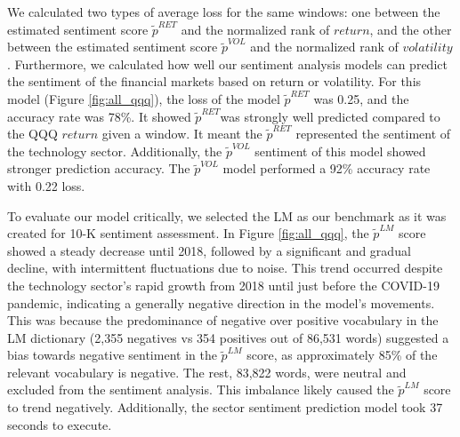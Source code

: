\documentclass[logo,bsc,singlespacing,parskip]{infthesis}
\begin{document}
We calculated two types of average loss for the same windows: one between the estimated sentiment score $\tilde{p}^{RET}$ and the normalized rank of $return$, and the other between the estimated sentiment score $\tilde{p}^{VOL}$ and the normalized rank of $volatility$. Furthermore, we calculated how well our sentiment analysis models can predict the sentiment of the financial markets based on return or volatility. For this model (Figure \ref{fig:all_qqq}), the loss of the model $\tilde{p}^{RET}$ was 0.25, and the accuracy rate was 78\%. It showed $\tilde{p}^{RET}$was strongly well predicted compared to the QQQ $return$ given a window. It meant the $\tilde{p}^{RET}$ represented the sentiment of the technology sector. Additionally, the $\tilde{p}^{VOL}$ sentiment of this model showed stronger prediction accuracy. The $\tilde{p}^{VOL}$ model performed a 92\% accuracy rate with 0.22 loss. 

To evaluate our model critically, we selected the LM as our benchmark as it was created for 10-K sentiment assessment. In Figure \ref{fig:all_qqq}, the $\tilde{p}^{LM}$ score showed a steady decrease until 2018, followed by a significant and gradual decline, with intermittent fluctuations due to noise. This trend occurred despite the technology sector's rapid growth from 2018 until just before the COVID-19 pandemic, indicating a generally negative direction in the model's movements. This was because the predominance of negative over positive vocabulary in the LM dictionary (2,355 negatives vs 354 positives out of 86,531 words) suggested a bias towards negative sentiment in the $\tilde{p}^{LM}$ score, as approximately 85\% of the relevant vocabulary is negative. The rest, 83,822 words, were neutral and excluded from the sentiment analysis. This imbalance likely caused the $\tilde{p}^{LM}$ score to trend negatively. Additionally, the sector sentiment prediction model took 37 seconds to execute. 
\end{document}
